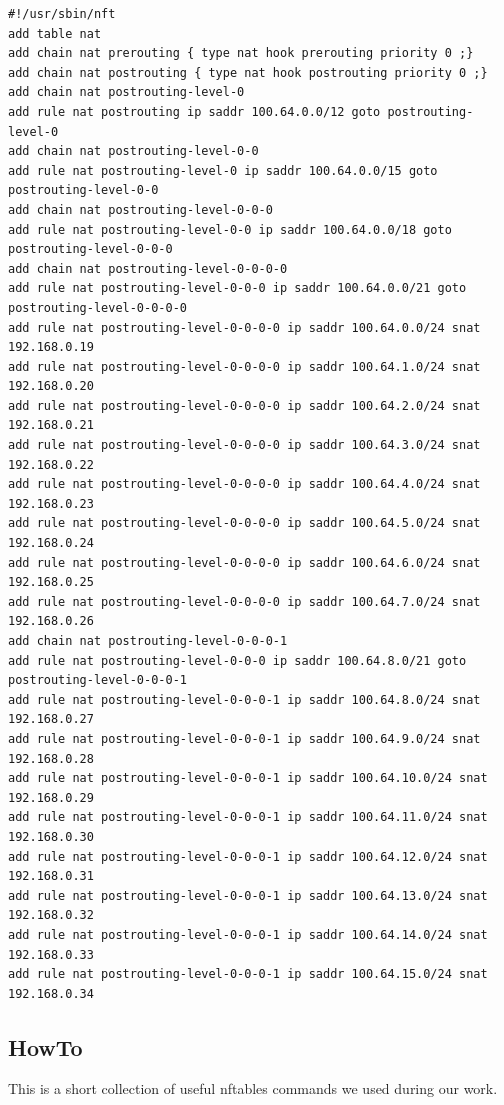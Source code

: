 \documentclass{report}
\begin{document}
\begingroup
\fontsize{9pt}{9pt}\selectfont
\begin{verbatim}
#!/usr/sbin/nft
add table nat
add chain nat prerouting { type nat hook prerouting priority 0 ;}
add chain nat postrouting { type nat hook postrouting priority 0 ;}
add chain nat postrouting-level-0
add rule nat postrouting ip saddr 100.64.0.0/12 goto postrouting-level-0
add chain nat postrouting-level-0-0
add rule nat postrouting-level-0 ip saddr 100.64.0.0/15 goto postrouting-level-0-0
add chain nat postrouting-level-0-0-0
add rule nat postrouting-level-0-0 ip saddr 100.64.0.0/18 goto postrouting-level-0-0-0
add chain nat postrouting-level-0-0-0-0
add rule nat postrouting-level-0-0-0 ip saddr 100.64.0.0/21 goto postrouting-level-0-0-0-0
add rule nat postrouting-level-0-0-0-0 ip saddr 100.64.0.0/24 snat 192.168.0.19
add rule nat postrouting-level-0-0-0-0 ip saddr 100.64.1.0/24 snat 192.168.0.20
add rule nat postrouting-level-0-0-0-0 ip saddr 100.64.2.0/24 snat 192.168.0.21
add rule nat postrouting-level-0-0-0-0 ip saddr 100.64.3.0/24 snat 192.168.0.22
add rule nat postrouting-level-0-0-0-0 ip saddr 100.64.4.0/24 snat 192.168.0.23
add rule nat postrouting-level-0-0-0-0 ip saddr 100.64.5.0/24 snat 192.168.0.24
add rule nat postrouting-level-0-0-0-0 ip saddr 100.64.6.0/24 snat 192.168.0.25
add rule nat postrouting-level-0-0-0-0 ip saddr 100.64.7.0/24 snat 192.168.0.26
add chain nat postrouting-level-0-0-0-1
add rule nat postrouting-level-0-0-0 ip saddr 100.64.8.0/21 goto postrouting-level-0-0-0-1
add rule nat postrouting-level-0-0-0-1 ip saddr 100.64.8.0/24 snat 192.168.0.27
add rule nat postrouting-level-0-0-0-1 ip saddr 100.64.9.0/24 snat 192.168.0.28
add rule nat postrouting-level-0-0-0-1 ip saddr 100.64.10.0/24 snat 192.168.0.29
add rule nat postrouting-level-0-0-0-1 ip saddr 100.64.11.0/24 snat 192.168.0.30
add rule nat postrouting-level-0-0-0-1 ip saddr 100.64.12.0/24 snat 192.168.0.31
add rule nat postrouting-level-0-0-0-1 ip saddr 100.64.13.0/24 snat 192.168.0.32
add rule nat postrouting-level-0-0-0-1 ip saddr 100.64.14.0/24 snat 192.168.0.33
add rule nat postrouting-level-0-0-0-1 ip saddr 100.64.15.0/24 snat 192.168.0.34
\end{verbatim}
\endgroup

\subsection{HowTo}

This is a short collection of useful nftables commands we used during
our work.
\end{document}
